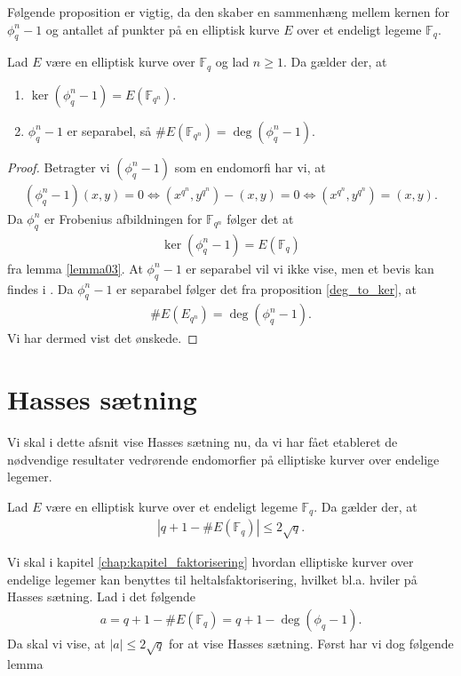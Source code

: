 Følgende proposition er vigtig, da den skaber en sammenhæng mellem kernen for $\phi_{q}^{n} - 1$ og antallet af punkter på en elliptisk kurve $E$ over et endeligt legeme $\mathbb{F}_{q}$.

\begin{proposition}
\label{prop_imp}
Lad $E$ være en elliptisk kurve over $\mathbb{F}_q$ og lad $n \geq 1$. Da gælder der,
at 
\begin{enumerate}
	\item $\ker (\phi_{q}^n - 1) = E(\mathbb{F}_{q^n})$. \label{test}
	\item $\phi_{q}^{n}-1$ er separabel, så $\#E(\mathbb{F}_{q^n})=\deg (\phi_{q}^{n}-1)$. 
\end{enumerate}
\end{proposition}
\begin{proof}
Betragter vi $(\phi_{q}^{n} - 1)$ som en endomorfi har vi, at
\begin{align*}
	(\phi_{q}^{n} - 1)(x, y) = 0 \Leftrightarrow (x^{q^n}, y^{q^n}) - (x, y) = 0 
	\Leftrightarrow (x^{q^n}, y^{q^n}) = (x, y).
\end{align*}
Da $\phi_{q}^{n}$ er Frobenius afbildningen for $\mathbb{F}_{q^n}$ følger det at 
\begin{align*}
	\ker (\phi_{q}^{n} - 1) = E(\mathbb{F}_q)
\end{align*} 
fra lemma \ref{lemma03}. At $\phi_{q}^{n} -1$ er separabel vil vi ikke vise, men et bevis kan findes
i \cite[s.~58]{Washington}. Da $\phi_{q}^{n} - 1$ er separabel følger det fra proposition \ref{deg_to_ker}, at
\begin{align*}
	\#E(E_{q^n})=\deg(\phi_{q}^{n} -1).
\end{align*} 
Vi har dermed vist det ønskede.
\end{proof}

\section{Hasses sætning}
Vi skal i dette afsnit vise Hasses sætning nu, da vi har fået etableret de nødvendige resultater vedrørende endomorfier på elliptiske kurver over endelige legemer.

\begin{thm}[Hasse]
\label{hasse}
Lad $E$ være en elliptisk kurve over et endeligt legeme $\mathbb{F}_q$. Da gælder der, at 
\begin{align*}
	|q + 1 - \#E(\mathbb{F}_q)| \leq 2 \sqrt{q}.
\end{align*}
\end{thm}
Vi skal i kapitel \ref{chap:kapitel_faktorisering} hvordan elliptiske kurver over endelige legemer kan benyttes til heltalsfaktorisering, hvilket bl.a. hviler på Hasses sætning.
Lad i det følgende 
\begin{align}
	\label{hasse_as}
	a = q + 1 - \#E(\mathbb{F}_q) = q + 1 - \deg(\phi_q - 1).
\end{align}
Da skal vi vise, at $|a| \leq 2 \sqrt{q}$ for at vise Hasses sætning. Først har vi dog følgende lemma

